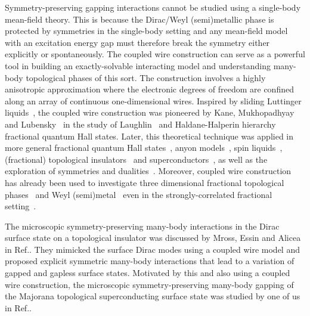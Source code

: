 Symmetry-preserving gapping interactions cannot be studied using a single-body mean-field theory. This is because the Dirac/Weyl (semi)metallic phase is protected by symmetries in the single-body setting and any mean-field model with an excitation energy gap must therefore break the symmetry either explicitly or spontaneously. The coupled wire construction can serve as a powerful tool in building an exactly-solvable interacting model and understanding many-body topological phases of this sort. The construction involves a highly anisotropic approximation where the electronic degrees of freedom are confined along an array of continuous one-dimensional wires. Inspired by sliding Luttinger liquids~\cite{OHernLubenskyToner99,EmeryFradkinKivelsonLubensky00,VishwanathCarpentier01,SondhiYang01,MukhopadhyayKaneLubensky01}, the coupled wire construction was pioneered by Kane, Mukhopadhyay and Lubensky~\cite{KaneMukhopadhyayLubensky02} in the study of Laughlin~\cite{Laughlin83} and Haldane-Halperin hierarchy~\cite{Haldane83,Halperin84} fractional quantum Hall states. Later, this theoretical technique was applied in more general fractional quantum Hall states~\cite{TeoKaneCouplewires,KlinovajaLoss14,MengStanoKlinovajaLoss14,SagiOregSternHalperin15,KaneSternHalperin17}, anyon models~\cite{OregSelaStern14,StoudenmireClarkeMongAlicea15}, spin liquids~\cite{MengNeupertGreiterThomale15,GorohovskyPereiraSela15}, (fractional) topological insulators~\cite{NeupertChamonMudryThomale14,KlinovajaTserkovnyak14,SagiOreg14,SagiOreg15,SantosHuangGefenGutman15} and superconductors~\cite{mongg2,SeroussiBergOreg14}, as well as the exploration of symmetries and dualities~\cite{MrossAliceaMotrunich16,MrossAliceaMotrunich17}. Moreover, coupled wire construction has already been used to investigate three dimensional fractional topological phases~\cite{Meng15,IadecolaNeupertChamonMudry16,IadecolaNeupertChamonMudry17} and Weyl (semi)metal~\cite{Vazifeh13} even in the strongly-correlated fractional setting~\cite{MengGrushinShtengelBardarson16}. 

The microscopic symmetry-preserving many-body interactions in the Dirac surface state on a topological insulator was discussed by Mross, Essin and Alicea in Ref.\cite{MrossEssinAlicea15}. They mimicked the surface Dirac modes using a coupled wire model and proposed explicit symmetric many-body interactions that lead to a variation of gapped and gapless surface states. Motivated by this and also using a coupled wire construction, the microscopic symmetry-preserving many-body gapping of the Majorana topological superconducting surface state was studied by one of us in Ref.\cite{SahooZhangTeo15}. 

